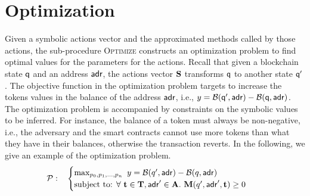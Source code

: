 \section{Optimization} \label{sec:opframe} 
Given a symbolic actions vector and the approximated methods called by those actions, the sub-procedure \textsc{Optimize} constructs an optimization problem to find optimal values for the parameters for the actions. Recall that given a blockchain state $\mathsf{q}$ and an address $\mathsf{adr}$, the actions vector $\mathbf{S}$ transforms $\mathsf{q}$ to another state $\mathsf{q}'$. The objective function in the optimization problem targets to increase the tokens values in the balance of the address $\mathsf{adr}$, i.e., $y = \mathcal{B}(\mathsf{q}',\mathsf{adr}) -  \mathcal{B}(\mathsf{q},\mathsf{adr})$. The optimization problem is accompanied by constraints on the symbolic values to be inferred. For instance, the balance of a token must always be non-negative, i.e., the adversary and the smart contracts cannot use more tokens than what they have in their balances, otherwise the transaction reverts. %
In the following, we give an example of the optimization problem.
\vspace{-1mm}
\begin{align*}  
\mathcal{P}: \ \ \ & \begin{cases} 
    \max_{p_0, p_1, ..., p_n}\ y = \mathcal{B}(q',\mathsf{adr}) -  \mathcal{B}(q,\mathsf{adr}) \\ 
   \textrm{subject to: } \forall\ \mathbf{t} \in \mathbf{T}, \mathsf{adr}' \in \mathbf{A}.\ \mathbf{M}(q',\mathsf{adr}',\mathbf{t})  \geq 0   
    \end{cases}       
\end{align*}  

